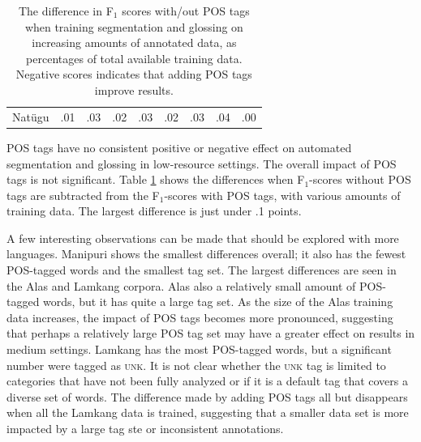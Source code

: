 \begin{table}[ht]
\begin{tabular}{l|cccccccc}
       Nat\"ugu & .01 & .03 & .02 & .03 & .02 & .03 & .04 & .00 \\
    \end{tabular}
    \caption[Segmenting and Glossing with/out POS tags]{The difference in F$_1$ scores with/out POS tags when training segmentation and glossing on increasing amounts of annotated data, as percentages of total available training data. Negative scores indicates that adding POS tags improve results.
    }
    \label{tab:POSSG}
\end{table}

POS tags have no consistent positive or negative effect on automated segmentation and glossing in low-resource settings. The overall impact of POS tags is not significant. Table \ref{tab:POSSG} shows the differences when F$_1$-scores without POS tags are subtracted from the F$_1$-scores with POS tags, with various amounts of training data. The largest difference is just under .1 points. 

A few interesting observations can be made that should be explored with more languages. Manipuri shows the smallest differences overall; it also has the fewest POS-tagged words and the smallest tag set. The largest differences are seen in the Alas and Lamkang corpora. Alas also a relatively small amount of POS-tagged words, but it has quite a large tag set. As the size of the Alas training data increases, the impact of POS tags becomes more pronounced, suggesting that perhaps a relatively large POS tag set may have a greater effect on results in medium settings. Lamkang has the most POS-tagged words, but a significant number were tagged as \textsc{unk}. It is not clear whether the \textsc{unk} tag is limited to categories that have not been fully analyzed or if it is a default tag that covers a diverse set of words. The difference made by adding POS tags all but disappears when all the Lamkang data is trained, suggesting that a smaller data set is more impacted by a large tag ste or inconsistent annotations.

